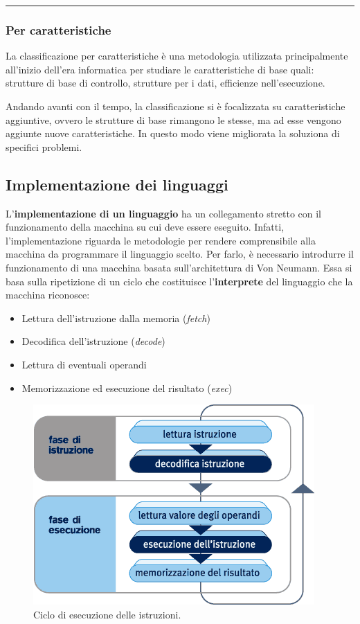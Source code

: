 \documentclass[a4paper]{article}
\newcommand{\longline}{\noindent\rule{\textwidth}{0.4pt}}
\begin{document}
	\longline

	\subsubsection{Per caratteristiche}
	
	La classificazione per caratteristiche è una metodologia utilizzata principalmente all'inizio dell'era informatica per studiare le caratteristiche di base quali: strutture di base di controllo, strutture per i dati, efficienze nell'esecuzione.\newline
	
	\noindent
	Andando avanti con il tempo, la classificazione si è focalizzata su caratteristiche aggiuntive, ovvero le strutture di base rimangono le stesse, ma ad esse vengono aggiunte nuove caratteristiche. In questo modo viene migliorata la soluziona di specifici problemi.\newpage
	
	\subsection{Implementazione dei linguaggi}
	
	L'\textbf{implementazione di un linguaggio} ha un collegamento stretto con il funzionamento della macchina su cui deve essere eseguito. Infatti, l'implementazione riguarda le metodologie per rendere comprensibile alla macchina da programmare il linguaggio scelto. Per farlo, è necessario introdurre il funzionamento di una macchina basata sull'architettura di Von Neumann. Essa si basa sulla ripetizione di un ciclo che costituisce l'\textbf{interprete} del linguaggio che la macchina riconosce:
	\begin{itemize}
		\item Lettura dell'istruzione dalla memoria (\emph{fetch})
		
		\item Decodifica dell'istruzione (\emph{decode})
		
		\item Lettura di eventuali operandi
		
		\item Memorizzazione ed esecuzione del risultato (\emph{exec})
	\end{itemize}
	\begin{figure}[!htp]
		\centering
		\includegraphics[width=.75\textwidth]{img/fasi_esecuzione.png}
		\caption{Ciclo di esecuzione delle istruzioni.}
	\end{figure}\newpage
\end{document}
